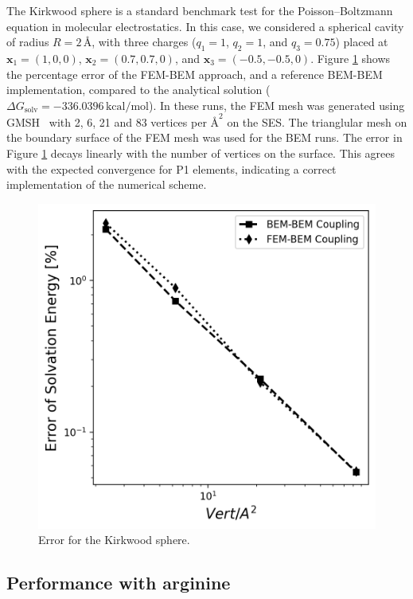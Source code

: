 The Kirkwood sphere \cite{Kirkwood1934} is a standard benchmark test for the Poisson--Boltzmann equation in molecular electrostatics. 
In this case, we considered a spherical cavity of radius $R=2\,\text{\AA}$, with three charges ($q_1=1$, $q_2=1$, and $q_3=0.75$) placed at $\mathbf{x}_1=(1,0,0)$, $\mathbf{x}_2=(0.7,0.7,0)$, and $\mathbf{x}_3=(-0.5,-0.5,0)$.
Figure \ref{fig:error_sphere} shows the percentage error of the FEM-BEM approach, and a reference BEM-BEM implementation, compared to the analytical solution ($\Delta G_{\text{solv}}= -336.0396\,\text{kcal/mol}$).
In these runs, the FEM mesh was generated using GMSH~\cite{geuzaine2009gmsh} 
with %
2, 6, 21 and 83 vertices per $\text{\AA}^2$ on the SES. The trianglular mesh on the boundary surface of the FEM mesh was used for the BEM runs. 
The error in Figure \ref{fig:error_sphere} decays linearly with the number of vertices on the surface. This agrees with the expected convergence for P1 elements, indicating a correct implementation of the numerical scheme. 

\begin{figure}
  \centering
  \includegraphics[width=0.45\linewidth]{DolfinX_Sphere_const_coeff_error.png}
  \caption{Error for the Kirkwood sphere.  }
  \label{fig:error_sphere}
\end{figure}

\subsection*{\sffamily \large Performance with arginine}

